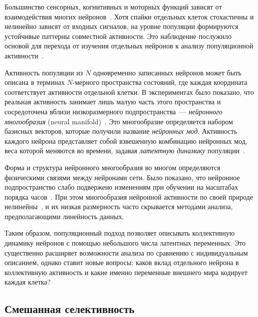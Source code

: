 Большинство сенсорных, когнитивных и моторных функций зависят от взаимодействия многих нейронов~\cite{Averbeck2006}. Хотя спайки отдельных клеток стохастичны и нелинейно зависят от входных сигналов, на уровне популяции формируются устойчивые паттерны совместной активности. Это наблюдение послужило основой для перехода от изучения отдельных нейронов к анализу популяционной активности~\cite{Pouget2000}.

Активность популяции из $N$ одновременно записанных нейронов может быть описана в терминах $N$-мерного пространства состояний, где каждая координата соответствует активности отдельной клетки. В экспериментах было показано, что реальная активность занимает лишь малую часть этого пространства и сосредоточена вблизи низкоразмерного подпространства~--- \textit{нейронного многообразия} (neural manifold)~\cite{Gallego2017}. Это многообразие определяется набором базисных векторов, которые получили название \textit{нейронных мод}. Активность каждого нейрона представляет собой взвешенную комбинацию нейронных мод, веса которой меняются во времени, задавая \textit{латентную динамику} популяции~\cite{Cunningham2014}.

Форма и структура нейронного многообразия во многом определяются физическими связями между нейронами сети. Было показано, что нейронное подпространство слабо подвержено изменениям при обучении на масштабах порядка часов~\cite{Gallego2018}. При этом многообразия нейронной активности по своей природе нелинейны~\cite{De2023, Fortunato2023}, и их низкая размерность часто скрывается методами анализа, предполагающими линейность данных.

Таким образом, популяционный подход позволяет описывать коллективную динамику нейронов с помощью небольшого числа латентных переменных. Это существенно расширяет возможности анализа по сравнению с индивидуальным описанием, однако ставит новые вопросы: каков вклад отдельного нейрона в коллективную активность и какие именно переменные внешнего мира кодирует каждая клетка?

\subsection{Смешанная селективность}
\label{sec:mixed_selectivity}

